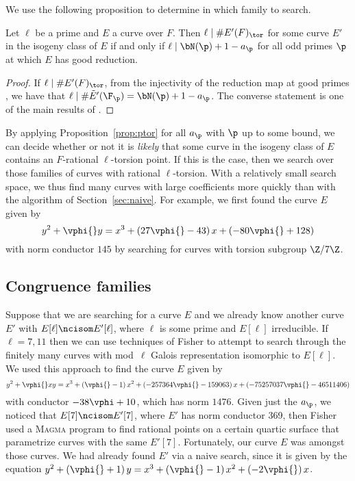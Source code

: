 \documentclass{amsart}
\begin{document}
We use the following proposition to determine in which family to
search.
\begin{proposition}\label{prop:ptor}
Let $\ell$ be a prime and $E$ a curve over $F$.
Then $\ell \mid \# E'(F)_{\tor}$ for some curve $E'$ in the isogeny class
of $E$ if and only if $\ell \mid \bN(\p)+1 - a_{\p}$ for all
odd primes $\p$ at which $E$ has good reduction.
\end{proposition}
\begin{proof}
If $\ell  \mid \# E'(F)_{\tor}$, from the injectivity of the
reduction map at good primes \cite[Appendix]{katz:torsion}, we have that
$\ell \mid \#\tilde E'(\F_\p) = \bN(\p)+1 - a_{\p}$. The converse statement
is one of the main results of \cite{katz:torsion}.
\end{proof}

By applying Proposition~\ref{prop:ptor} for all $a_{\p}$ with $\p$ up
to some bound, we can decide whether or not it is {\em likely} that
some curve in the isogeny class of $E$ contains an $F$-rational
$\ell$-torsion point. If this is the case, then we search over those
families of curves with rational $\ell$-torsion. With a relatively small
search space, we thus find many curves with large coefficients more
quickly than with the algorithm of Section~\ref{sec:naive}.
For example, we first found the curve $E$ given by 
$$y^2 + \vphi{}y = x^3 + \left(27 \vphi{} - 43\right)x + \left(-80 \vphi{} + 128\right) 
$$ with norm conductor $145$ by searching for curves with torsion subgroup $\Z/7\Z$.


\subsection{Congruence families}\label{sec:congfam}
Suppose that we are searching for a curve $E$ and we already know
another curve $E'$ with $E[\ell] \ncisom E'[\ell]$, where $\ell$ is
some prime and $E[\ell]$ irreducible.  If $\ell=7,11$ then we can use
techniques of Fisher \cite{fisher:families_cong} to attempt to search
through the finitely many curves with mod~$\ell$ Galois representation
isomorphic to $E[\ell]$.
We used this approach to find the curve $E$ given by
\begin{equation}\label{equation:fisher-curve}
y^2 + \vphi{}xy = x^3 + \left(\vphi{} - 1\right)x^2 + \left(-257364 \vphi{} - 159063\right)x + \left(-75257037 \vphi{} - 46511406\right)
\end{equation}
with conductor $-38 \vphi + 10$, which has norm $1476$.  Given just the $a_{\p}$, we noticed that
$E[7] \ncisom E'[7]$, where $E'$ has norm conductor 369, then Fisher
used a \textsc{Magma} \cite{magma} program to find rational points on a certain
quartic surface that parametrize curves with the same $E'[7]$.
Fortunately, our curve $E$ was amongst those curves.
We had already found $E'$ via a naive search, since it is given
by the equation $y^2 + \left(\vphi{} + 1\right)y = x^3 + \left(\vphi{} - 1\right)x^2 + \left(-2 \vphi{}\right)x$.
\end{document}
